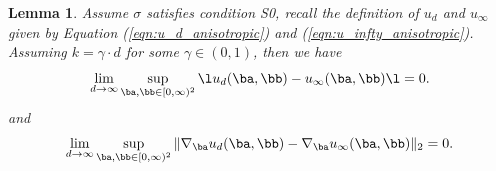 \documentclass[11pt]{article}
\newtheorem{lemma}{Lemma}
\begin{document}
\begin{lemma}\label{lem:perturbation_bound_anisotropic_dynamics}
Assume $\sigma$ satisfies condition {\sf S0}, recall the definition of $u_d$ and $u_\infty$ given by Equation (\ref{eqn:u_d_anisotropic}) and (\ref{eqn:u_infty_anisotropic}). Assuming $k = \gamma \cdot d$ for some $\gamma \in (0, 1)$, then we have
\[
\lim_{d \rightarrow \infty} \sup_{\ba, \bb \in [0, \infty)^2} \l u_d(\ba, \bb) - u_\infty(\ba, \bb) \l = 0.
\]
and
\[
\lim_{d \rightarrow \infty} \sup_{\ba, \bb \in [0, \infty)^2} \| \nabla_\ba u_d(\ba, \bb) - \nabla_\ba u_\infty(\ba, \bb) \|_2 = 0. 
\]
\end{lemma}
%
%
%
%
%
%
%
\end{document}
